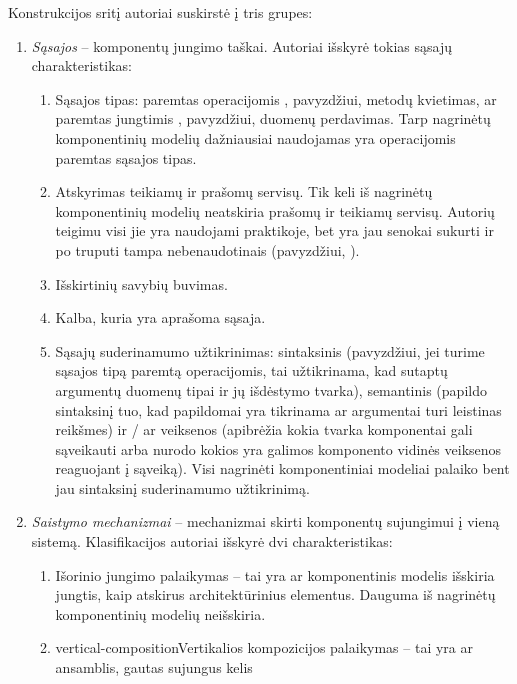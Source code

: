 Konstrukcijos sritį autoriai suskirstė į tris grupes:
\begin{enumerate}
  \item \emph{Sąsajos}  – komponentų jungimo taškai.
    Autoriai išskyrė tokias sąsajų charakteristikas:
    \begin{enumerate}
      \item Sąsajos tipas: paremtas operacijomis ,
        pavyzdžiui, metodų kvietimas, ar paremtas jungtimis
        , pavyzdžiui, duomenų perdavimas. Tarp nagrinėtų
        komponentinių modelių dažniausiai naudojamas yra operacijomis
        paremtas sąsajos tipas.
      \item Atskyrimas teikiamų ir prašomų servisų. Tik keli iš
        nagrinėtų komponentinių modelių neatskiria prašomų ir
        teikiamų servisų. Autorių teigimu visi jie yra naudojami
        praktikoje, bet yra jau senokai sukurti ir po truputi tampa
        nebenaudotinais (pavyzdžiui, ).
      \item Išskirtinių savybių buvimas.
      \item Kalba, kuria yra aprašoma sąsaja.
      \item Sąsajų suderinamumo užtikrinimas: sintaksinis (pavyzdžiui,
        jei turime sąsajos tipą paremtą operacijomis, tai
        užtikrinama, kad sutaptų argumentų duomenų tipai ir jų
        išdėstymo tvarka), semantinis (papildo sintaksinį tuo, kad
        papildomai yra tikrinama ar argumentai turi leistinas reikšmes)
        ir / ar veiksenos (apibrėžia kokia tvarka komponentai gali
        sąveikauti arba nurodo kokios yra galimos komponento vidinės
        veiksenos reaguojant į sąveiką). Visi nagrinėti
        komponentiniai modeliai palaiko bent jau sintaksinį
        suderinamumo užtikrinimą.
    \end{enumerate}
  \item \emph{Saistymo mechanizmai}  – mechanizmai
    skirti komponentų sujungimui į vieną sistemą. Klasifikacijos
    autoriai išskyrė dvi charakteristikas:
    \begin{enumerate}
      \item Išorinio jungimo palaikymas – tai yra ar komponentinis modelis
        išskiria jungtis, kaip atskirus architektūrinius elementus.
        Dauguma iš nagrinėtų komponentinių modelių neišskiria.
      \item \gls{vertical-composition}{Vertikalios kompozicijos}
        palaikymas – tai yra ar ansamblis, gautas sujungus kelis

\end{enumerate}
\end{enumerate}
